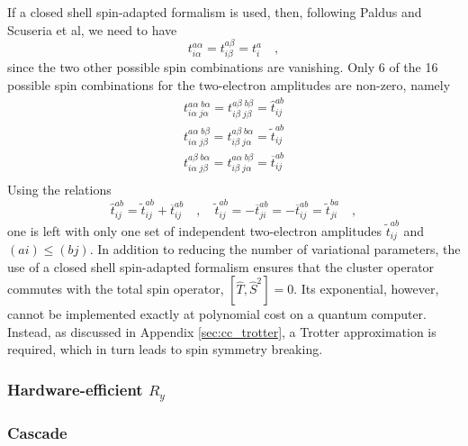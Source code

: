 \documentclass[aps,pra,twocolumn]{revtex4-2}
\begin{document}
If a closed shell spin-adapted formalism is used, then, following Paldus and Scuseria et al, we need to have
\begin{equation}
t^{a \alpha}_{i \alpha} = t^{a \beta}_{i \beta} = t^a_i \quad,
\end{equation}
since the two other possible spin combinations are vanishing. 
Only 6 of the 16 possible spin combinations for the two-electron amplitudes are non-zero, namely
\begin{equation}
\begin{split}
t^{a \alpha \; b \alpha}_{i \alpha \; j \alpha} = t^{a \beta \; b \beta}_{i \beta\; j\beta} = \hat{t}^{ab}_{ij} \\
t^{a \alpha \; b \beta}_{i \alpha \; j \beta} = t^{a \beta \; b \alpha}_{i \beta\; j\alpha} = \tilde{t}^{ab}_{ij} \\
t^{a \beta \; b \alpha}_{i \alpha \; j \beta} = t^{a \alpha \; b \beta}_{i \beta\; j\alpha} = \overline{t}^{ab}_{ij} \\
\end{split}
\end{equation}
Using the relations
\begin{equation}
\hat{t}^{ab}_{ij} = \tilde{t}^{ab}_{ij} + \overline{t}^{ab}_{ij}
\quad,\quad
\tilde{t}^{ab}_{ij} = - \overline{t}^{ab}_{ji} = - \overline{t}^{ab}_{ij} = \tilde{t}^{ba}_{ji}
\quad,
\end{equation}
one is left with only one set of independent two-electron amplitudes $\tilde{t}^{ab}_{ij}$ and $(ai) \leq (bj)$. In addition to reducing the 
number of variational parameters, the use of a closed shell spin-adapted formalism ensures that the cluster operator commutes with 
the total spin operator, $[ \hat{T} , \hat{S}^2 ] = 0$.
Its exponential, however, cannot be implemented exactly at polynomial cost on a quantum computer. 
Instead, as discussed in Appendix \ref{sec:cc_trotter}, a Trotter approximation is required, which in turn leads to spin symmetry breaking.

\subsubsection{Hardware-efficient $R_y$}

\subsubsection{Cascade}

\end{document}
